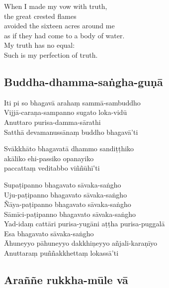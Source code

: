 When I made my vow with truth,\\
the great crested flames\\
avoided the sixteen acres around me\\
as if they had come to a body of water.\\
My truth has no equal:\\
Such is my perfection of truth.

\subsection{Buddha-dhamma-saṅgha-guṇā}
\label{iti-pi-so}


\begin{paritta}
Iti pi so bhagavā arahaṃ sammā-sambuddho\\
Vijjā-caraṇa-sampanno sugato loka-vidū\\
Anuttaro purisa-damma-sārathi\\
Satthā devamanussānaṃ buddho bhagavā'ti

Svākkhāto bhagavatā dhammo sandiṭṭhiko\\
\vin akāliko ehi-passiko opanayiko\\
paccattaṃ veditabbo viññūhī'ti

Supaṭipanno bhagavato sāvaka-saṅgho\\
Uju-paṭipanno bhagavato sāvaka-saṅgho\\
Ñāya-paṭipanno bhagavato sāvaka-saṅgho\\
Sāmīci-paṭipanno bhagavato sāvaka-saṅgho\\
Yad-idaṃ cattāri purisa-yugāni aṭṭha purisa-puggalā\\
Esa bhagavato sāvaka-saṅgho\\
Āhuneyyo pāhuneyyo dakkhiṇeyyo añjali-karaṇīyo\\
Anuttaraṃ puññakkhettaṃ lokassā'ti
\end{paritta}

\subsection{Araññe rukkha-mūle vā}


